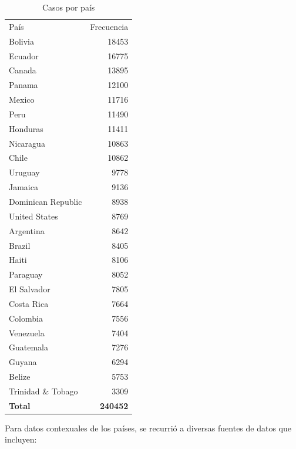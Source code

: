 \documentclass[
  spanish,
  letterpaper,
  DIV=11,
  numbers=noendperiod]{scrartcl}
\begin{document}
\begin{longtable}[t]{lr}

\caption{\label{tbl-paises}Casos por país}

\tabularnewline

\\
\toprule
País & Frecuencia\\
\midrule
Bolivia & 18453\\
Ecuador & 16775\\
Canada & 13895\\
Panama & 12100\\
Mexico & 11716\\
\addlinespace
Peru & 11490\\
Honduras & 11411\\
Nicaragua & 10863\\
Chile & 10862\\
Uruguay & 9778\\
\addlinespace
Jamaica & 9136\\
Dominican Republic & 8938\\
United States & 8769\\
Argentina & 8642\\
Brazil & 8405\\
\addlinespace
Haiti & 8106\\
Paraguay & 8052\\
El Salvador & 7805\\
Costa Rica & 7664\\
Colombia & 7556\\
\addlinespace
Venezuela & 7404\\
Guatemala & 7276\\
Guyana & 6294\\
Belize & 5753\\
Trinidad \& Tobago & 3309\\
\addlinespace
\textbf{Total} & \textbf{240452}\\
\bottomrule

\end{longtable}

Para datos contexuales de los países, se recurrió a diversas fuentes de
datos que incluyen:
\end{document}
